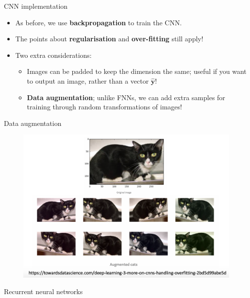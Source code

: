 \documentclass{beamer}
\begin{document}
\begin{frame}{CNN implementation}
\begin{itemize}
\item As before, we use \textbf{backpropagation} to train the CNN.
\item The points about \textbf{regularisation} and \textbf{over-fitting} still apply!
\item Two extra considerations:
\begin{itemize}
\item Images can be padded to keep the dimension the same; useful if you want to output an image, rather than a vector $\hat{\mathbf{y}}$!
\item \textbf{Data augmentation}; unlike FNNs, we can add extra samples for training through random transformations of images!
\end{itemize}
\end{itemize}
\end{frame}
\begin{frame}{Data augmentation}
\begin{figure}
\includegraphics[width=0.9\linewidth]{Images/cat.png}
\end{figure}
\end{frame}
\begin{frame}
\begin{center}
\Huge Recurrent neural networks
\end{center}
\end{frame}
\end{document}
